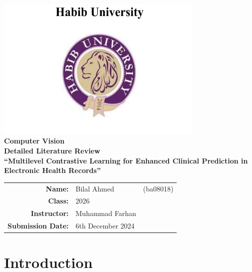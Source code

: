 \documentclass[a4paper]{article}
\begin{document}
    \begin{center}
        \includegraphics[width=10cm]{LOGOHABIB.png}
        \\
        \vspace{5mm}
        {\huge \textbf{Computer Vision}} \\ %
        \vspace{7mm}
        {\LARGE \textbf{Detailed Literature Review}} \\ %
        \vspace{15mm}
        {\Large \textbf{``Multilevel Contrastive Learning for Enhanced Clinical Prediction in Electronic Health Records''}}\\
        \vspace{70mm}
        \begin{minipage}{0.7\textwidth}
            \begin{tabular}{rlr}
                {\large \textbf{Name:}}            & {\large Bilal Ahmed}       & {\large (ba08018)} \\[2mm]
                {\large \textbf{Class:}}           & {\large 2026}              &                    \\[3mm]
                {\large \textbf{Instructor:}}      & {\large Muhammad Farhan}   &                    \\[3mm]
                {\large \textbf{Submission Date:}} & {\large 6th December 2024} &
            \end{tabular}
        \end{minipage}
        \vfill %
    \end{center}
    \newpage
    \tableofcontents
    \clearpage

    \section{Introduction}
\end{document}
